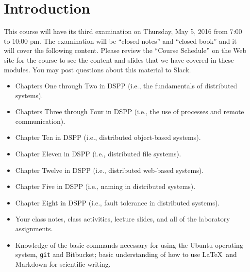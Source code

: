 


\vspace*{-.35in}
\section*{Introduction}
\vspace*{-.05in}

This course will have its third examination on Thursday, May 5, 2016 from 7:00 to 10:00 pm. The examination will be
``closed notes'' and ``closed book'' and it will cover the following content. Please review the ``Course Schedule'' on
the Web site for the course to see the content and slides that we have covered in these modules. You may post questions
about this material to Slack.

\vspace*{-.05in}

\begin{itemize}

  \itemsep 0in

  \item Chapters One through Two in DSPP (i.e., the fundamentals of distributed systems).

  \item Chapters Three through Four in DSPP (i.e., the use of processes and remote communication).

  \item Chapter Ten in DSPP (i.e., distributed object-based systems).

  \item Chapter Eleven in DSPP (i.e., distributed file systems).

  \item Chapter Twelve in DSPP (i.e., distributed web-based systems).

  \item Chapter Five in DSPP (i.e., naming in distributed systems).

  \item Chapter Eight in DSPP (i.e., fault tolerance in distributed systems).

  \item Your class notes, class activities, lecture slides, and all of the laboratory assignments.

  \item Knowledge of the basic commands necessary for using the Ubuntu operating system, {\tt git} and Bitbucket; basic
    understanding of how to use \LaTeX~and Markdown for scientific writing.

\end{itemize}

